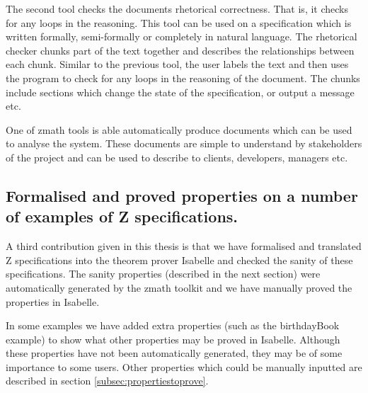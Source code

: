 The second tool checks the documents rhetorical correctness. That is, it checks
for any loops in the reasoning. This tool can be used on a specification which
is written formally, semi-formally or completely in natural language. The
rhetorical checker chunks part of the text together and describes the
relationships between each chunk. Similar to the previous tool, the user labels
the text and then uses the program to check for any loops in the reasoning of
the document. The chunks include sections which change the state of the
specification, or output a message etc.

One of \gls{zmath} tools is able automatically produce documents which can be
used to analyse the system. These documents are simple to understand by
stakeholders of the project and can be used to describe to clients, developers,
managers etc. 

\subsection{Formalised and proved properties on a number of examples of Z specifications.}

A third contribution given in this thesis is that we have formalised and
translated Z specifications into the theorem prover Isabelle and checked the
sanity of these specifications. The sanity properties (described in the next
section) were automatically generated by the \gls{zmath} toolkit and we have
manually proved the properties in Isabelle.

In some examples we have added extra properties (such as the birthdayBook
example) to show what other properties may be proved in Isabelle. Although these
properties have not been automatically generated, they may be of some importance
to some users. Other properties which could be manually inputted are described
in section \ref{subsec:propertiestoprove}.

%

